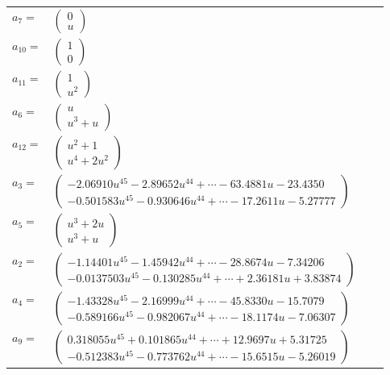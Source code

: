 \documentclass[1p]{elsarticle_modified}
\theoremstyle{definition}
\begin{document}
\begin{tabular}{m{7pt} m{180pt} m{7pt} m{180pt} }
\flushright $a_{7}=$&$\begin{pmatrix}0\\u\end{pmatrix}$ \\
\flushright $a_{10}=$&$\begin{pmatrix}1\\0\end{pmatrix}$ \\
\flushright $a_{11}=$&$\begin{pmatrix}1\\u^2\end{pmatrix}$ \\
\flushright $a_{6}=$&$\begin{pmatrix}u\\u^3+u\end{pmatrix}$ \\
\flushright $a_{12}=$&$\begin{pmatrix}u^2+1\\u^4+2 u^2\end{pmatrix}$ \\
\flushright $a_{3}=$&$\begin{pmatrix}-2.06910 u^{45}-2.89652 u^{44}+\cdots-63.4881 u-23.4350\\-0.501583 u^{45}-0.930646 u^{44}+\cdots-17.2611 u-5.27777\end{pmatrix}$ \\
\flushright $a_{5}=$&$\begin{pmatrix}u^3+2 u\\u^3+u\end{pmatrix}$ \\
\flushright $a_{2}=$&$\begin{pmatrix}-1.14401 u^{45}-1.45942 u^{44}+\cdots-28.8674 u-7.34206\\-0.0137503 u^{45}-0.130285 u^{44}+\cdots+2.36181 u+3.83874\end{pmatrix}$ \\
\flushright $a_{4}=$&$\begin{pmatrix}-1.43328 u^{45}-2.16999 u^{44}+\cdots-45.8330 u-15.7079\\-0.589166 u^{45}-0.982067 u^{44}+\cdots-18.1174 u-7.06307\end{pmatrix}$ \\
\flushright $a_{9}=$&$\begin{pmatrix}0.318055 u^{45}+0.101865 u^{44}+\cdots+12.9697 u+5.31725\\-0.512383 u^{45}-0.773762 u^{44}+\cdots-15.6515 u-5.26019\end{pmatrix}$ \\

\end{tabular}
\end{document}
